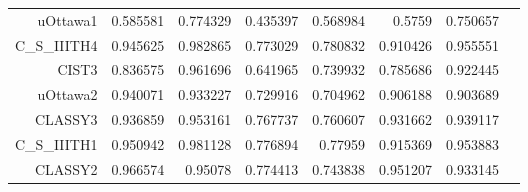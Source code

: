 \begin{table}[h]
\begin{tabular}{rlrrrrrr}
    uOttawa1 & 0.585581 & 0.774329 & 0.435397 & 0.568984 & 0.5759 & 0.750657 \\
    C\_S\_IIITH4 & 0.945625 & 0.982865 & 0.773029 & 0.780832 & 0.910426 & 0.955551 \\
    CIST3 & 0.836575 & 0.961696 & 0.641965 & 0.739932 & 0.785686 & 0.922445 \\
    uOttawa2 & 0.940071 & 0.933227 & 0.729916 & 0.704962 & 0.906188 & 0.903689 \\
    CLASSY3  & 0.936859 & 0.953161 & 0.767737 & 0.760607 & 0.931662 & 0.939117 \\
    C\_S\_IIITH1 & 0.950942 & 0.981128 & 0.776894 & 0.77959 & 0.915369 & 0.953883 \\
    CLASSY2 & 0.966574 & 0.95078 & 0.774413 & 0.743838 & 0.951207 & 0.933145 \\
    \hline
    \end{tabular}%
  \label{tab:addlabel}%
\end{table}%

